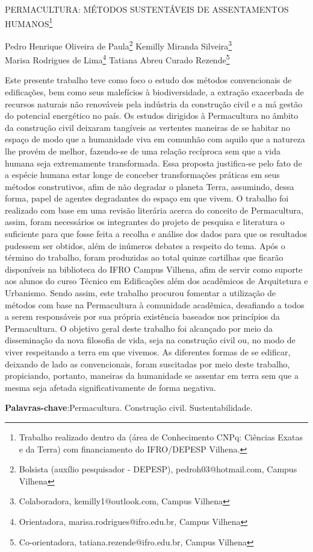 \documentclass[article,12pt,onesidea,4paper,english,brazil]{abntex2}
\begin{document}
	
	
	\frenchspacing 
	
	\begin{center}
		\LARGE PERMACULTURA: MÉTODOS SUSTENTÁVEIS DE ASSENTAMENTOS
		HUMANOS\footnote{Trabalho realizado dentro da (área de Conhecimento CNPq: Ciências Exatas e da Terra) com
			financiamento do IFRO/DEPESP Vilhena.}
		
		\normalsize
		Pedro Henrique Oliveira de Paula\footnote{Bolsista (auxílio pesquisador - DEPESP), pedroh03@hotmail.com, Campus Vilhena} 
		Kemilly Miranda Silveira\footnote{Colaboradora, kemilly1@outlook.com, Campus Vilhena} \\
		Marisa Rodrigues de Lima\footnote{Orientadora, marisa.rodrigues@ifro.edu.br, Campus Vilhena} 
		Tatiana	Abreu Curado Rezende\footnote{Co-orientadora, tatiana.rezende@ifro.edu.br, Campus Vilhena}
		 
	\end{center}
	
	\noindent Este presente trabalho teve como foco o estudo dos métodos convencionais de
	edificações, bem como seus malefícios à biodiversidade, a extração exacerbada de
	recursos naturais não renováveis pela indústria da construção civil e a má gestão do
	potencial energético no país. Os estudos dirigidos à Permacultura no âmbito da
	construção civil deixaram tangíveis as vertentes maneiras de se habitar no espaço
	de modo que a humanidade viva em comunhão com aquilo que a natureza lhe
	provém de melhor, fazendo-se de uma relação recíproca sem que a vida humana
	seja extremamente transformada. Essa proposta justifica-se pelo fato de a espécie
	humana estar longe de conceber transformações práticas em seus métodos
	construtivos, afim de não degradar o planeta Terra, assumindo, dessa forma, papel
	de agentes degradantes do espaço em que vivem. O trabalho foi realizado com base
	em uma revisão literária acerca do conceito de Permacultura, assim, foram
	necessários os integrantes do projeto de pesquisa e literatura o suficiente para que
	fosse feita a recolha e análise dos dados para que os resultados pudessem ser
	obtidos, além de inúmeros debates a respeito do tema. Após o término do trabalho,
	foram produzidas ao total quinze cartilhas que ficarão disponíveis na biblioteca do
	IFRO Campus Vilhena, afim de servir como suporte aos alunos do curso Técnico em
	Edificações além dos acadêmicos de Arquitetura e Urbanismo. Sendo assim, este
	trabalho procurou fomentar a utilização de métodos com base na Permacultura à
	comunidade acadêmica, desafiando a todos a serem responsáveis por sua própria
	existência baseados nos princípios da Permacultura. O objetivo geral deste trabalho
	foi alcançado por meio da disseminação da nova filosofia de vida, seja na
	construção civil ou, no modo de viver respeitando a terra em que vivemos. As
	diferentes formas de se edificar, deixando de lado as convencionais, foram
	suscitadas por meio deste trabalho, propiciando, portanto, maneiras da humanidade
	se assentar em terra sem que a mesma seja afetada significativamente de forma
	negativa.
	
	\vspace{\onelineskip}
	
	\noindent
	\textbf{Palavras-chave}:Permacultura. Construção civil. Sustentabilidade.
	
\end{document}
